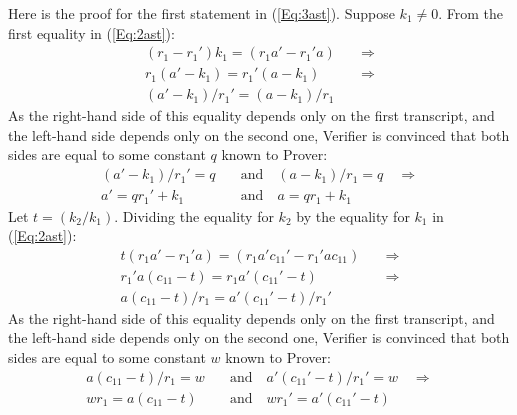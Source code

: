 \documentclass{mathcryptology} %
\theoremstyle{title}
\theoremstyle{titleof}
\renewenvironment{proof}{\noindent{\bfseries Proof:} }{}
\begin{document}
\begin{proof}
        Here is the proof for the first statement in (\ref{Eq:3ast}\label{***}).        
        Suppose $k_{1}\neq0$. From the first equality in (\ref{Eq:2ast}\label{**}):
        \begin{align*}
            \left(r_{1} - r_{1}'\right) k_{1} =
            \left(r_{1} a' - r_{1}'a\right)  &\quad\Rightarrow \\
            r_{1} \left(a' - k_{1}\right) =
            r_{1}' \left(a - k_{1}\right) &\quad\Rightarrow \\
            \left(a' - k_{1}\right) / r_{1}' =
            \left(a - k_{1}\right)  / r_{1}
        \end{align*}
        As the right-hand side of this equality depends only on the first transcript, and the left-hand side depends only on the second one, Verifier is convinced that both sides are equal to some constant $q$ known to Prover:
        \begin{align*}
            \left(a' - k_{1}\right) / r_{1}' = q
            & \quad\text{and}\quad
            \left(a-k_{1}\right) / r_{1} = q \quad\Rightarrow \\
            a' = qr_{1}' + k_{1}
            & \quad\text{and}\quad
            a=qr_{1}+k_{1}\label{Eq:4ast}\tag{****}
        \end{align*}
        Let $t=\left(k_{2}/k_{1}\right)$. Dividing the equality for $k_{2}$ by the equality for $k_{1}$ in (\ref{Eq:2ast}\label{**}):
        \begin{align*}
            t\left(r_{1} a' - r_{1}' a\right) =
            \left(r_{1} a' c_{11}' - r_{1}' a c_{11}\right) &\quad\Rightarrow \\
            r_{1}' a \left(c_{11} - t\right) =
            r_{1} a' \left(c_{11}' - t\right) &\quad\Rightarrow \\
            a\left(c_{11} -t\right) / r_{1} = a'\left(c_{11}' - t\right) / r_{1}'
        \end{align*}
        As the right-hand side of this equality depends only on the first transcript, and the left-hand
        side depends only on the second one, Verifier is convinced that both sides are equal to some constant $w$ known to Prover:
        \begin{align*}
            a \left(c_{11}  - t\right) / r_{1}  = w & \quad\text{and}\quad
            a'\left(c_{11}' - t\right) / r_{1}' = w \quad\Rightarrow \\
            wr_{1} = a\left(c_{11} - t\right) & \quad\text{and}\quad
            wr_{1}' = a'\left(c_{11}' - t\right)

\end{align*}
\end{proof}
\end{document}
